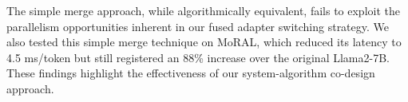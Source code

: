 The simple merge approach, while algorithmically equivalent, fails to exploit the parallelism opportunities inherent in our fused adapter switching strategy. We also tested this simple merge technique on MoRAL, which reduced its latency to 4.5 ms/token but still registered an 88\% increase over the original Llama2-7B. These findings highlight the effectiveness of our system-algorithm co-design approach.




